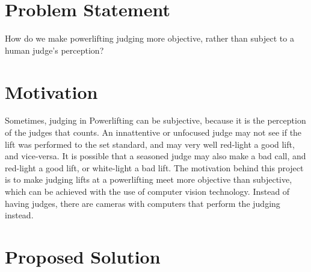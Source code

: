 \documentclass{article}
\begin{document}
\section{Problem Statement}
How do we make powerlifting judging more objective, rather than subject to a human judge's perception?
\section{Motivation}
Sometimes, judging in Powerlifting can be subjective, because it is the perception of the judges that counts.  An innattentive or unfocused judge may not see if the lift was performed to the set standard, and may very well red-light a good lift, and vice-versa. It is possible that a seasoned judge may also make a bad call, and red-light a good lift, or white-light a bad lift. The motivation behind this project is to make judging lifts at a powerlifting meet more objective than subjective, which can be achieved with the use of computer vision technology. Instead of having judges, there are cameras with computers that perform the judging instead.  
\section{Proposed Solution}
\end{document}

